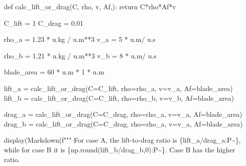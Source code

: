 \documentclass[
  letterpaper,
  DIV=11,
  numbers=noendperiod]{scrartcl}
\newenvironment{Shaded}{\begin{snugshade}}{\end{snugshade}}
\newcommand{\BuiltInTok}[1]{\textcolor[rgb]{0.00,0.23,0.31}{#1}}
\newcommand{\ControlFlowTok}[1]{\textcolor[rgb]{0.00,0.23,0.31}{#1}}
\newcommand{\DecValTok}[1]{\textcolor[rgb]{0.68,0.00,0.00}{#1}}
\newcommand{\FloatTok}[1]{\textcolor[rgb]{0.68,0.00,0.00}{#1}}
\newcommand{\KeywordTok}[1]{\textcolor[rgb]{0.00,0.23,0.31}{#1}}
\newcommand{\NormalTok}[1]{\textcolor[rgb]{0.00,0.23,0.31}{#1}}
\newcommand{\OperatorTok}[1]{\textcolor[rgb]{0.37,0.37,0.37}{#1}}
\newcommand{\SpecialCharTok}[1]{\textcolor[rgb]{0.37,0.37,0.37}{#1}}
\newcommand{\SpecialStringTok}[1]{\textcolor[rgb]{0.13,0.47,0.30}{#1}}
\begin{document}
\begin{Shaded}
\begin{Highlighting}[]
\KeywordTok{def}\NormalTok{ calc\_lift\_or\_drag(C, rho, v, Af,):}
    \ControlFlowTok{return}\NormalTok{ C}\OperatorTok{*}\NormalTok{rho}\OperatorTok{*}\NormalTok{Af}\OperatorTok{*}\NormalTok{v}


\NormalTok{C\_lift }\OperatorTok{=} \DecValTok{1}
\NormalTok{C\_drag }\OperatorTok{=} \FloatTok{0.01} 

\NormalTok{rho\_a }\OperatorTok{=} \FloatTok{1.23} \OperatorTok{*}\NormalTok{ u.kg }\OperatorTok{/}\NormalTok{ u.m}\OperatorTok{**}\DecValTok{3}
\NormalTok{v\_a }\OperatorTok{=} \DecValTok{5} \OperatorTok{*}\NormalTok{ u.m}\OperatorTok{/}\NormalTok{ u.s}

\NormalTok{rho\_b }\OperatorTok{=} \FloatTok{1.21} \OperatorTok{*}\NormalTok{ u.kg }\OperatorTok{/}\NormalTok{ u.m}\OperatorTok{**}\DecValTok{3}
\NormalTok{v\_b }\OperatorTok{=} \DecValTok{8} \OperatorTok{*}\NormalTok{ u.m}\OperatorTok{/}\NormalTok{ u.s}

\NormalTok{blade\_area }\OperatorTok{=} \DecValTok{60} \OperatorTok{*}\NormalTok{ u.m }\OperatorTok{*} \DecValTok{1} \OperatorTok{*}\NormalTok{ u.m }


\NormalTok{lift\_a }\OperatorTok{=}\NormalTok{ calc\_lift\_or\_drag(C}\OperatorTok{=}\NormalTok{C\_lift, rho}\OperatorTok{=}\NormalTok{rho\_a, v}\OperatorTok{=}\NormalTok{v\_a, Af}\OperatorTok{=}\NormalTok{blade\_area)}
\NormalTok{lift\_b }\OperatorTok{=}\NormalTok{ calc\_lift\_or\_drag(C}\OperatorTok{=}\NormalTok{C\_lift, rho}\OperatorTok{=}\NormalTok{rho\_b, v}\OperatorTok{=}\NormalTok{v\_b, Af}\OperatorTok{=}\NormalTok{blade\_area)}

\NormalTok{drag\_a }\OperatorTok{=}\NormalTok{ calc\_lift\_or\_drag(C}\OperatorTok{=}\NormalTok{C\_drag, rho}\OperatorTok{=}\NormalTok{rho\_a, v}\OperatorTok{=}\NormalTok{v\_a, Af}\OperatorTok{=}\NormalTok{blade\_area)}
\NormalTok{drag\_b }\OperatorTok{=}\NormalTok{ calc\_lift\_or\_drag(C}\OperatorTok{=}\NormalTok{C\_drag, rho}\OperatorTok{=}\NormalTok{rho\_a, v}\OperatorTok{=}\NormalTok{v\_a, Af}\OperatorTok{=}\NormalTok{blade\_area)}

\NormalTok{display(Markdown(}\SpecialStringTok{f"""}
\SpecialStringTok{For case A, the lift{-}to{-}drag ratio is }\SpecialCharTok{\{}\NormalTok{lift\_a}\OperatorTok{/}\NormalTok{drag\_a}\SpecialCharTok{:}\NormalTok{P}\OperatorTok{\textasciitilde{}}\SpecialCharTok{\}}\SpecialStringTok{, while for case B it is }\SpecialCharTok{\{}\NormalTok{np}\SpecialCharTok{.}\BuiltInTok{round}\NormalTok{(lift\_b}\OperatorTok{/}\NormalTok{drag\_b,}\DecValTok{0}\NormalTok{)}\SpecialCharTok{:}\NormalTok{P}\OperatorTok{\textasciitilde{}}\SpecialCharTok{\}}\SpecialStringTok{. Case B has the higher ratio. }


\end{Highlighting}
\end{Shaded}
\end{document}
